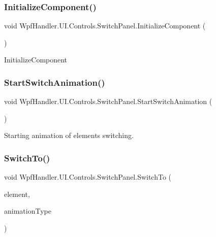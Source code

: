 \subsubsection{\texorpdfstring{Initialize\+Component()}{InitializeComponent()}\hspace{0.1cm}{\footnotesize\ttfamily [4/4]}}
{\footnotesize\ttfamily void Wpf\+Handler.\+U\+I.\+Controls.\+Switch\+Panel.\+Initialize\+Component (\begin{DoxyParamCaption}{ }\end{DoxyParamCaption})}



Initialize\+Component 

\mbox{\label{class_wpf_handler_1_1_u_i_1_1_controls_1_1_switch_panel_a2227b95066799ff4d9b0431c97513643}} 
\subsubsection{\texorpdfstring{Start\+Switch\+Animation()}{StartSwitchAnimation()}}
{\footnotesize\ttfamily void Wpf\+Handler.\+U\+I.\+Controls.\+Switch\+Panel.\+Start\+Switch\+Animation (\begin{DoxyParamCaption}{ }\end{DoxyParamCaption})\hspace{0.3cm}{\ttfamily [protected]}}



Starting animation of elements switching. 

\mbox{\label{class_wpf_handler_1_1_u_i_1_1_controls_1_1_switch_panel_a324749b533fdd754c87f490379f49082}} 
\subsubsection{\texorpdfstring{Switch\+To()}{SwitchTo()}}
{\footnotesize\ttfamily void Wpf\+Handler.\+U\+I.\+Controls.\+Switch\+Panel.\+Switch\+To (\begin{DoxyParamCaption}\item[{U\+I\+Element}]{element,  }\item[{\mbox{\hyperlink{class_wpf_handler_1_1_u_i_1_1_controls_1_1_switch_panel_aad6e1d850ec0101cc8d98c259971e272}{Animation\+Type}}}]{animation\+Type }\end{DoxyParamCaption})}



